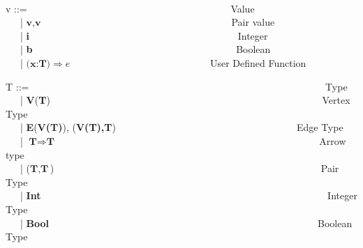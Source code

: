 \begin{frame}
{\ \\
  v ::= \ \ \ \ \ \ \ \ \ \ \ \ \ \ \ \ \ \ \ \ \ \ \ \ \ \ \ \ \ \ \ \ \ \ \ \ \ \ \ \ \ Value \\
    \ \ \ | $\textbf{v},\textbf{v}$ \ \ \ \ \ \ \ \ \ \ \ \ \ \ \ \ \ \ \ \ \ \ \ \ \ \ \ \ \ \ \ \ \ \ \ \ \ \ Pair value \\
    \ \ \ | \textbf{i} \ \ \ \ \ \ \ \ \ \ \ \ \ \ \ \  \ \ \ \ \ \ \ \ \ \ \ \ \ \ \ \ \ \ \ \ \ \ \ \ \ \ Integer \\
    \ \ \ | \textbf{b} \ \ \ \ \ \ \ \ \ \ \ \ \ \ \ \ \ \ \ \ \ \ \ \ \ \ \ \ \ \ \ \ \ \ \ \ \ \ \ \ \ Boolean \\
    \ \ \ | $\textbf{(x:T)} \Rightarrow e $ \ \ \ \ \ \ \ \ \ \ \ \ \ \ \ \ \ \ \ \ \ \ \ \ \ \ \ \  User Defined Function \\
    }
\end{frame}

\begin{frame}
  \tiny{
  T ::= \ \ \ \ \ \ \ \ \ \ \ \ \ \ \ \ \ \ \ \ \ \ \ \ \ \ \ \ \ \ \ \ \ \ \ \ \ \ \ \ \ \ \ \ \ \ \ \ \ \ \ \ \ \ \ \ \ \ \ \ Type \\
    \ \ \ | \textbf{V}(\textbf{T}) \ \ \ \ \ \ \ \ \ \ \ \ \ \ \ \ \ \ \ \ \ \ \ \ \ \ \ \ \ \ \ \ \ \ \ \ \ \ \ \ \ \ \ \ \ \ \ \ \ \ \ \ \ \ \ Vertex Type \\
    \ \ \ | \textbf{E}(\textbf{V(T)}), (\textbf{V(T),}\textbf{T})\ \ \ \ \ \ \ \ \ \ \ \ \ \ \ \ \ \ \ \ \ \ \ \ \ \ \ \ \ \ \ \ \ \ \ \ \  Edge Type\\
    \ \ \ | $\textbf{T} \Rightarrow \textbf{T}$ \ \ \ \ \ \ \ \ \ \  \ \ \ \ \ \ \ \ \ \ \ \ \ \ \ \ \ \ \ \ \ \ \ \ \ \ \ \ \ \  \ \ \ \ \ \ \ \ \ \ \ \ \ Arrow type \\
    \ \ \ | ($\textbf{T}, \textbf{T}$) \ \ \ \ \ \ \ \ \ \ \ \ \ \ \ \ \ \ \ \ \ \ \ \ \ \ \ \ \ \ \ \ \ \ \ \ \ \ \ \ \ \ \ \ \ \ \ \ \ \ \ \ \ \ Pair Type \\
    \ \ \ | \textbf{Int} \ \ \ \ \ \ \ \ \ \ \ \ \ \ \ \ \ \ \ \ \ \ \ \ \ \ \ \ \ \ \ \ \ \ \ \ \ \ \ \ \ \ \ \ \ \ \ \ \ \ \ \ \ \ \ \ \ \ Integer Type \\
    \ \ \ | \textbf{Bool}\ \ \ \ \ \ \ \ \ \ \ \  \ \ \ \ \ \ \ \ \ \ \ \ \ \ \ \ \ \ \ \ \ \ \ \ \ \ \ \ \ \ \ \ \ \ \ \ \ \ \ \ \ \ \  Boolean Type
}
\end{frame}

